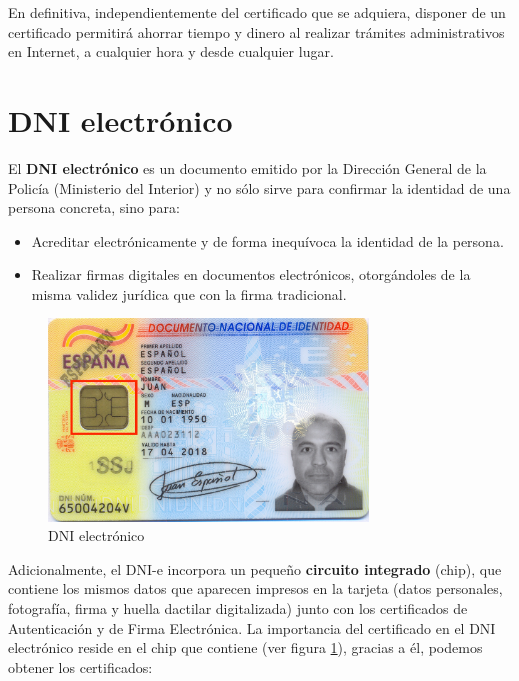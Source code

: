 \documentclass{manual}
\begin{document}
En definitiva, independientemente del certificado que se adquiera, disponer de un certificado permitirá ahorrar tiempo y dinero al realizar trámites administrativos en Internet, a cualquier hora y desde cualquier lugar.


\vspace{0.2cm}
\section{DNI electrónico}

El \textbf{DNI electrónico} es un documento emitido por la Dirección General de la Policía (Ministerio del Interior) y no sólo sirve para confirmar la identidad de una persona concreta, sino para:

\begin{itemize}
	\item Acreditar electrónicamente y de forma inequívoca la identidad de la persona.
	\item Realizar firmas digitales en documentos electrónicos, otorgándoles de la misma validez jurídica que con la firma tradicional.
\end{itemize}

\begin{figure}[H]
	\centering
	\includegraphics[width=85mm]{images/anverso_2}
	\caption{DNI electrónico} 
	\label{1}
\end{figure}

Adicionalmente, el DNI-e incorpora un pequeño \textbf{circuito integrado} (chip), que contiene los mismos datos que aparecen impresos en la tarjeta (datos personales, fotografía, firma y huella dactilar digitalizada) junto con los certificados de Autenticación y de Firma Electrónica. La importancia del certificado en el DNI electrónico reside en el chip que contiene (ver figura \ref{1}), gracias a él, podemos obtener los certificados:
\end{document}
